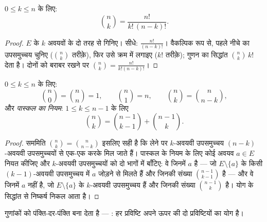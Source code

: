 \begin{theorem}\label{thm:g12:comb:binomformula}
$0 \leq k \leq n$ के लिए:
\[
\binom{n}{k} = \frac{n!}{k!\,(n-k)!} .
\]
\end{theorem}

\begin{proof}
$E$ के $k$ अवयवों के  दो तरह से गिनिए। सीधे: $\frac{n!}{(n-k)!}$। वैकल्पिक रूप से,
पहले नीचे का उपसमुच्चय चुनिए ($\binom nk$ तरीक़े), फिर उसे क्रम में लगाइए ($k!$
तरीक़े); गुणन का सिद्धांत $\binom{n}{k}\,k!$ देता है। दोनों को बराबर रखने पर $\binom nk = \frac{n!}{k!(n-k)!}$।
\end{proof}

\begin{proposition}[बुनियादी सर्वसमिकाएँ]\label{prop:g12:comb:identities}
$0 \leq k \leq n$ के लिए:
\[
\binom{n}{0} = \binom{n}{n} = 1, \qquad
\binom{n}{1} = n, \qquad
\binom{n}{k} = \binom{n}{n-k},
\]
और \emph{पास्कल का नियम}: $1 \leq k \leq n-1$ के लिए
\[
\binom{n}{k} = \binom{n-1}{k-1} + \binom{n-1}{k}.
\]
\end{proposition}

\begin{proof}
सममिति $\binom nk = \binom{n}{n-k}$ इसलिए सही है कि  लेने पर $k$-अवयवी उपसमुच्चय $(n-k)$-अवयवी
उपसमुच्चयों से एक-एक करके मिल जाते हैं। पास्कल के नियम के लिए कोई अवयव $a \in E$
नियत कीजिए और $k$-अवयवी उपसमुच्चयों को दो भागों में बाँटिए: वे जिनमें $a$
है --- जो $E \setminus \{a\}$ के किसी $(k-1)$-अवयवी उपसमुच्चय में $a$ जोड़ने से मिलते हैं और
जिनकी संख्या $\binom{n-1}{k-1}$ है --- और वे जिनमें $a$ नहीं है, जो $E \setminus \{a\}$ के $k$-अवयवी
उपसमुच्चय हैं और जिनकी संख्या $\binom{n-1}{k}$ है। योग के सिद्धांत से निष्कर्ष निकल आता
है।
\end{proof}

 गुणांकों को पंक्ति-दर-पंक्ति बना देता है --- \emph{}: हर प्रविष्टि अपने ऊपर की दो प्रविष्टियों का योग है।

